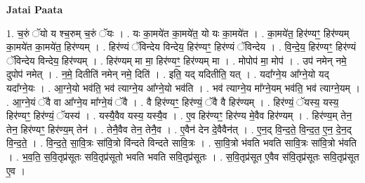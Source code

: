 \documentclass[17pt]{extarticle}
\begin{document}
\textbf{Jatai Paata} \newline

1. च॒रुं ॅयो य श्च॒रुम् च॒रुं ॅयः । . यः का॒मये॑त का॒मये॑त॒ यो यः का॒मये॑त । . का॒मये॑त॒ हिर॑ण्यꣳ॒॒ हिर॑ण्यम् का॒मये॑त का॒मये॑त॒ हिर॑ण्यम् । . हिर॑ण्यं ॅविन्देय विन्देय॒ हिर॑ण्यꣳ॒॒ हिर॑ण्यं ॅविन्देय । . वि॒न्दे॒य॒ हिर॑ण्यꣳ॒॒ हिर॑ण्यं ॅविन्देय विन्देय॒ हिर॑ण्यम् । . हिर॑ण्यम् मा मा॒ हिर॑ण्यꣳ॒॒ हिर॑ण्यम् मा । . मोपोप॑ मा॒ मोप॑ । . उप॑ नमेन् नमे॒ दुपोप॑ नमेत् । . न॒मे॒ दितीति॑ नमेन् नमे॒ दिति॑ । . इति॒ यद् यदितीति॒ यत् । . यदा᳚ग्ने॒य आ᳚ग्ने॒यो यद् यदा᳚ग्ने॒यः । . आ॒ग्ने॒यो भव॑ति॒ भव॑ त्याग्ने॒य आ᳚ग्ने॒यो भव॑ति । . भव॑ त्याग्ने॒य मा᳚ग्ने॒यम् भव॑ति॒ भव॑ त्याग्ने॒यम् । . आ॒ग्ने॒यं ॅवै वा आ᳚ग्ने॒य मा᳚ग्ने॒यं ॅवै । . वै हिर॑ण्यꣳ॒॒ हिर॑ण्यं॒ ॅवै वै हिर॑ण्यम् । . हिर॑ण्यं॒ ॅयस्य॒ यस्य॒ हिर॑ण्यꣳ॒॒ हिर॑ण्यं॒ ॅयस्य॑ । . यस्यै॒वैव यस्य॒ यस्यै॒व । . ए॒व हिर॑ण्यꣳ॒॒ हिर॑ण्य मे॒वैव हिर॑ण्यम् । . हिर॑ण्य॒म् तेन॒ तेन॒ हिर॑ण्यꣳ॒॒ हिर॑ण्य॒म् तेन॑ । . तेनै॒वैव तेन॒ तेनै॒व । . ए॒वैन॑ देन दे॒वैवैन॑त् । . ए॒न॒द् वि॒न्द॒ते॒ वि॒न्द॒त॒ ए॒न॒ दे॒न॒द् वि॒न्द॒ते॒ । . वि॒न्द॒ते॒ सा॒वि॒त्रः सा॑वि॒त्रो वि॑न्दते विन्दते सावि॒त्रः । . सा॒वि॒त्रो भ॑वति भवति सावि॒त्रः सा॑वि॒त्रो भ॑वति । . भ॒व॒ति॒ स॒वि॒तृप्र॑सूतः सवि॒तृप्र॑सूतो भवति भवति सवि॒तृप्र॑सूतः । . स॒वि॒तृप्र॑सूत ए॒वैव स॑वि॒तृप्र॑सूतः सवि॒तृप्र॑सूत ए॒व । \newline
\end{document}
